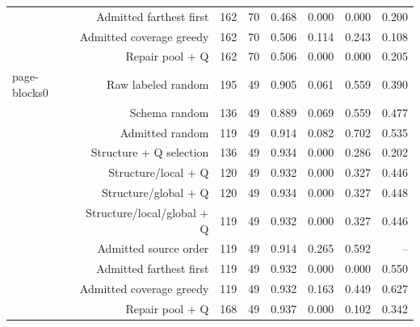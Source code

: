 \begin{table}[!t]
\begin{tabular}{lrrrrrrr}
 & Admitted farthest first & 162 & 70 & 0.468 & 0.000 & 0.000 & 0.200 \\
 & Admitted coverage greedy & 162 & 70 & 0.506 & 0.114 & 0.243 & 0.108 \\
 & Repair pool + Q & 162 & 70 & 0.506 & 0.000 & 0.000 & 0.205 \\
page-blocks0 & Raw labeled random & 195 & 49 & 0.905 & 0.061 & 0.559 & 0.390 \\
 & Schema random & 136 & 49 & 0.889 & 0.069 & 0.559 & 0.477 \\
 & Admitted random & 119 & 49 & 0.914 & 0.082 & 0.702 & 0.535 \\
 & Structure + Q selection & 136 & 49 & 0.934 & 0.000 & 0.286 & 0.202 \\
 & Structure/local + Q & 120 & 49 & 0.932 & 0.000 & 0.327 & 0.446 \\
 & Structure/global + Q & 120 & 49 & 0.934 & 0.000 & 0.327 & 0.448 \\
 & Structure/local/global + Q & 119 & 49 & 0.932 & 0.000 & 0.327 & 0.446 \\
 & Admitted source order & 119 & 49 & 0.914 & 0.265 & 0.592 & -- \\
 & Admitted farthest first & 119 & 49 & 0.932 & 0.000 & 0.000 & 0.550 \\
 & Admitted coverage greedy & 119 & 49 & 0.932 & 0.163 & 0.449 & 0.627 \\
 & Repair pool + Q & 168 & 49 & 0.937 & 0.000 & 0.102 & 0.342 \\
\bottomrule
\end{tabular}
\end{table}
